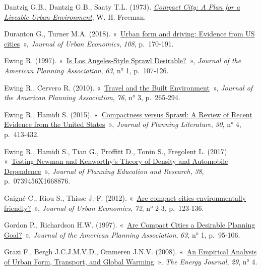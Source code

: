 \documentclass[
  9pt,
  a4paper,
  DIV=11]{scrreprt}
\newlength{\cslhangindent}
\newenvironment{CSLReferences}[2] %
 {\begin{list}{}{%
  \setlength{\itemindent}{0pt}
  \setlength{\leftmargin}{0pt}
  \setlength{\parsep}{0pt}
  \ifodd #1
   \setlength{\leftmargin}{\cslhangindent}
   \setlength{\itemindent}{-1\cslhangindent}
  \fi
  \setlength{\itemsep}{#2\baselineskip}}}
 {\end{list}}
\begin{document}
\begin{CSLReferences}{0}{1}
Dantzig G.B., Dantzig G.B., Saaty T.L. (1973).
\emph{\href{https://books.google.fr/books?id=PTeIQgAACAAJ}{Compact City:
A Plan for a Liveable Urban Environment}}, W. H. Freeman.

Duranton G., Turner M.A. (2018).
{«~\href{https://doi.org/10.1016/j.jue.2018.10.003}{Urban form and
driving: Evidence from US cities}~»}, \emph{Journal of Urban Economics},
\emph{108}, p.~170‑191.

Ewing R. (1997). {«~\href{https://doi.org/10.1080/01944369708975728}{Is
Los Angeles-Style Sprawl Desirable?}~»}, \emph{Journal of the American
Planning Association}, \emph{63}, n° 1, p.~107‑126.

Ewing R., Cervero R. (2010).
{«~\href{https://doi.org/10.1080/01944361003766766}{Travel and the Built
Environment}~»}, \emph{Journal of the American Planning Association},
\emph{76}, n° 3, p.~265‑294.

Ewing R., Hamidi S. (2015).
{«~\href{https://doi.org/10.1177/0885412215595439}{Compactness versus
Sprawl: A Review of Recent Evidence from the United States}~»},
\emph{Journal of Planning Literature}, \emph{30}, n° 4, p.~413‑432.

Ewing R., Hamidi S., Tian G., Proffitt D., Tonin S., Fregolent L.
(2017). {«~\href{https://doi.org/10.1177/0739456X16688767}{Testing
Newman and Kenworthy{'}s Theory of Density and Automobile
Dependence}~»}, \emph{Journal of Planning Education and Research},
\emph{38}, p.~0739456X1668876.

Gaigné C., Riou S., Thisse J.-F. (2012).
{«~\href{https://doi.org/10.1016/j.jue.2012.04.001}{Are compact cities
environmentally friendly?}~»}, \emph{Journal of Urban Economics},
\emph{72}, n° 2-3, p.~123‑136.

Gordon P., Richardson H.W. (1997).
{«~\href{https://doi.org/10.1080/01944369708975727}{Are Compact Cities a
Desirable Planning Goal?}~»}, \emph{Journal of the American Planning
Association}, \emph{63}, n° 1, p.~95‑106.

Grazi F., Bergh J.C.J.M.V.D., Ommeren J.N.V. (2008).
{«~\href{https://doi.org/10.5547/ISSN0195-6574-EJ-Vol29-No4-5}{An
Empirical Analysis of Urban Form, Transport, and Global Warming}~»},
\emph{The Energy Journal}, \emph{29}, n° 4.


\end{CSLReferences}
\end{document}
